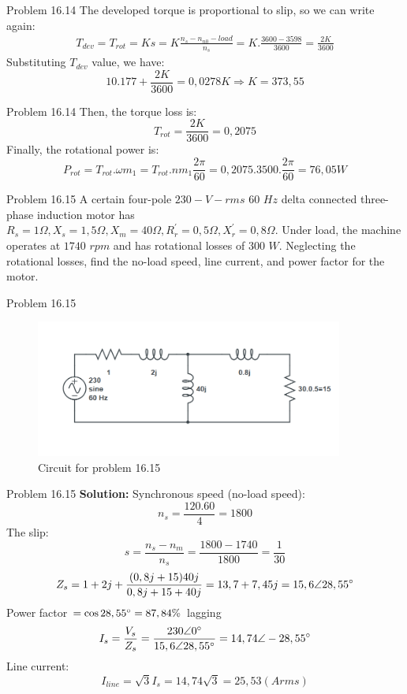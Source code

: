 \documentclass[11pt,aspectratio=169]{beamer}
\begin{document}
\begin{frame}{Problem 16.14}
    The developed torque is proportional to slip, so we can write again:
\begin{align*}
T_{dev}=T_{rot}=Ks=K\frac{n_{s}-n_{n0}-load}{n_{s}}=K.\frac{3600-3598}{3600}=\frac{2K}{3600}
\end{align*}
Substituting $T_{dev}$ value, we have:
$$10.177+\frac{2K}{3600}=0,0278K\Rightarrow K=373,55$$
\end{frame}
\begin{frame}{Problem 16.14}
Then, the torque loss is:
$$T_{rot}=\frac{2K}{3600}=0,2075$$
Finally, the rotational power is:
$$P_{rot}=T_{rot}.\omega m_{1}=T_{rot}.nm_{1}\frac{2\pi}{60}=0,2075.3500.\frac{2\pi}{60}=76,05W$$
\end{frame}
\begin{frame}{Problem 16.15}
    A certain four-pole $230-V-rms$ $60$ $Hz$ delta connected three-phase induction motor has
    $R_{s} = 1\Omega, X_{s} = 1,5\Omega, X_{m}=40\Omega,R_{r}^{'}=0,5\Omega,X_{r}^{'}=0,8\Omega$.    
    Under load, the machine operates at $1740$ 
    $rpm$ and has rotational losses of $300$ $W$. Neglecting the rotational losses, find the 
    no-load speed, line current, and power 
    factor for the motor.
\end{frame}
\begin{frame}{Problem 16.15}
    \begin{figure}[h]
        \centering
        \includegraphics[width=0.9\textwidth]{circuit.png}
        \caption{Circuit for problem 16.15}
        \label{nem_ngang}
        \end{figure}
    
\end{frame}
\begin{frame}{Problem 16.15}
  \textbf{Solution:}  Synchronous speed (no-load speed):
    $$n_{s}=\frac{120.60}{4}=1800$$
    The slip:
    $$s=\frac{n_{s}-n_{m}}{n_{s}}=\frac{1800-1740}{1800}=\frac{1}{30}$$
    $$Z_{s}=1+2j+\frac{(0,8j+15)40j}{0,8j+15+40j}=13,7+7,45j=15,6\angle 28,55\degree$$
    Power factor $=\cos{28,55\degree}=87,84\%$ lagging
    $$I_{s}=\frac{V_{s}}{Z_{s}}=\frac{230\angle 0\degree}{15,6\angle 28,55\degree}=14,74\angle -28,55\degree$$
    Line current:
    $$I_{line}=\sqrt{3}I_{s}=14,74\sqrt{3}=25,53 (A rms)$$
    
\end{frame}
\end{document}
